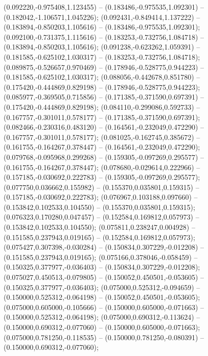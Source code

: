  (0.092220,-0.975408,1.123455) -- (0.183486,-0.975535,1.092301) -- (0.182042,-1.106571,1.045226);
 (0.092431,-0.849414,1.137222) -- (0.183894,-0.850203,1.105616) -- (0.183486,-0.975535,1.092301);
 (0.092100,-0.731375,1.115616) -- (0.183253,-0.732756,1.084718) -- (0.183894,-0.850203,1.105616);
 (0.091238,-0.623262,1.059391) -- (0.181585,-0.625102,1.030317) -- (0.183253,-0.732756,1.084718);
 (0.089875,-0.526657,0.970469) -- (0.178946,-0.528775,0.944223) -- (0.181585,-0.625102,1.030317);
 (0.088056,-0.442678,0.851780) -- (0.175420,-0.444869,0.829198) -- (0.178946,-0.528775,0.944223);
 (0.085977,-0.369505,0.715856) -- (0.171385,-0.371590,0.697391) -- (0.175420,-0.444869,0.829198);
 (0.084110,-0.299086,0.592733) -- (0.167757,-0.301011,0.578177) -- (0.171385,-0.371590,0.697391);
 (0.082466,-0.230316,0.483120) -- (0.164561,-0.232049,0.472290) -- (0.167757,-0.301011,0.578177);
 (0.081025,-0.162745,0.385672) -- (0.161755,-0.164267,0.378447) -- (0.164561,-0.232049,0.472290);
 (0.079768,-0.095968,0.299268) -- (0.159305,-0.097269,0.295577) -- (0.161755,-0.164267,0.378447);
 (0.078680,-0.029614,0.222966) -- (0.157185,-0.030692,0.222783) -- (0.159305,-0.097269,0.295577);
 (0.077750,0.036662,0.155982) -- (0.155370,0.035801,0.159315) -- (0.157185,-0.030692,0.222783);
 (0.076967,0.103188,0.097660) -- (0.153842,0.102533,0.104550) -- (0.155370,0.035801,0.159315);
 (0.076323,0.170280,0.047457) -- (0.152584,0.169812,0.057973) -- (0.153842,0.102533,0.104550);
 (0.075811,0.238247,0.004928) -- (0.151585,0.237943,0.019165) -- (0.152584,0.169812,0.057973);
 (0.075427,0.307398,-0.030284) -- (0.150834,0.307229,-0.012208) -- (0.151585,0.237943,0.019165);
 (0.075166,0.378046,-0.058459) -- (0.150325,0.377977,-0.036403) -- (0.150834,0.307229,-0.012208);
 (0.075027,0.450513,-0.079805) -- (0.150052,0.450501,-0.053605) -- (0.150325,0.377977,-0.036403);
 (0.075000,0.525312,-0.094659) -- (0.150000,0.525312,-0.064198) -- (0.150052,0.450501,-0.053605);
 (0.075000,0.605000,-0.105666) -- (0.150000,0.605000,-0.071663) -- (0.150000,0.525312,-0.064198);
 (0.075000,0.690312,-0.113624) -- (0.150000,0.690312,-0.077060) -- (0.150000,0.605000,-0.071663);
 (0.075000,0.781250,-0.118535) -- (0.150000,0.781250,-0.080391) -- (0.150000,0.690312,-0.077060);
